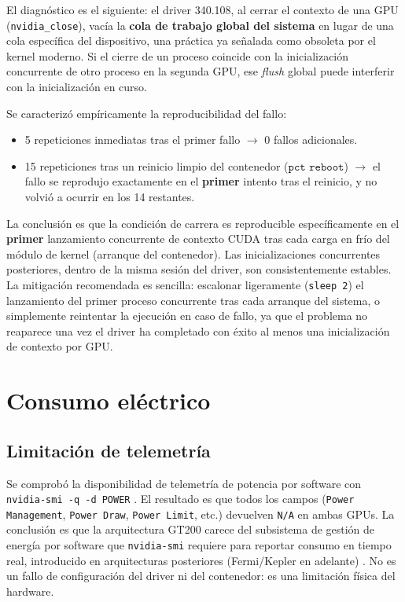 El diagnóstico es el siguiente: el driver 340.108, al cerrar el contexto de una GPU (\texttt{nvidia\_close}), vacía la \textbf{cola de trabajo global del sistema} en lugar de una cola específica del dispositivo, una práctica ya señalada como obsoleta por el kernel moderno. Si el cierre de un proceso coincide con la inicialización concurrente de otro proceso en la segunda GPU, ese \textit{flush} global puede interferir con la inicialización en curso.

Se caracterizó empíricamente la reproducibilidad del fallo:

\begin{itemize}
    \item 5 repeticiones inmediatas tras el primer fallo $\rightarrow$ 0 fallos adicionales.
    \item 15 repeticiones tras un reinicio limpio del contenedor ($\texttt{pct reboot}$) $\rightarrow$ el fallo se reprodujo exactamente en el \textbf{primer} intento tras el reinicio, y no volvió a ocurrir en los 14 restantes.
\end{itemize}

La conclusión es que la condición de carrera es reproducible específicamente en el \textbf{primer} lanzamiento concurrente de contexto CUDA tras cada carga en frío del módulo de kernel (arranque del contenedor). Las inicializaciones concurrentes posteriores, dentro de la misma sesión del driver, son consistentemente estables. La mitigación recomendada es sencilla: escalonar ligeramente (\texttt{sleep 2}) el lanzamiento del primer proceso concurrente tras cada arranque del sistema, o simplemente reintentar la ejecución en caso de fallo, ya que el problema no reaparece una vez el driver ha completado con éxito al menos una inicialización de contexto por GPU.

\section{Consumo eléctrico}

\subsection{Limitación de telemetría}

Se comprobó la disponibilidad de telemetría de potencia por software con \texttt{nvidia-smi -q -d POWER} \cite{nvidia_smi}. El resultado es que todos los campos (\texttt{Power Management}, \texttt{Power Draw}, \texttt{Power Limit}, etc.) devuelven \texttt{N/A} en ambas GPUs. La conclusión es que la arquitectura GT200 carece del subsistema de gestión de energía por software que \texttt{nvidia-smi} requiere para reportar consumo en tiempo real, introducido en arquitecturas posteriores (Fermi/Kepler en adelante) \cite{nvidia_legacy_gpus}. No es un fallo de configuración del driver ni del contenedor: es una limitación física del hardware.

